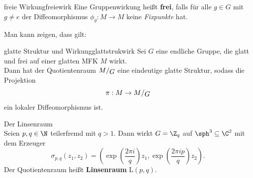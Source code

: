 \begin{definition}{freie Wirkung}{freiewirk}
Eine Gruppenwirkung heißt \textbf{frei}, falls für alle $g \in G$ mit $g \neq e$ der Diffeomorphismus $\phi_g: M \to M$ keine \textit{Fixpunkte} hat.
\end{definition}
Man kann zeigen, dass gilt:
\begin{satz}{glatte Struktur und Wirkung}{glattstrukwirk}
Sei $G$ eine endliche Gruppe, die glatt und frei auf einer glatten MFK $M$ wirkt.\\
Dann hat der Quotientenraum $\quotient{M}{G}$ eine eindeutige glatte Struktur, sodass die Projektion
\begin{equation}
\pi: M \to \quotient{M}{G}
\end{equation}
ein lokaler Diffeomorphismus ist.
\end{satz}
\begin{beispiel}Der Linsenraum\\
Seien $p, q \in \N$ teilerfremd mit $q>1$. Dann wirkt $G=\Z_q$ auf $\sph^3 \sub \C^2$ mit dem Erzeuger 
\begin{equation}
\sigma_{p,q} (z_1, z_2)= \left( \exp\left(\frac{2\pi i}{q}\right)z_1, \exp\left(\frac{2\pi i p}{q} \right)z_2\right).
\end{equation}
Der Quotientenraum heißt \textbf{Linsenraum} $\text{L}(p,q)$.
\end{beispiel}
